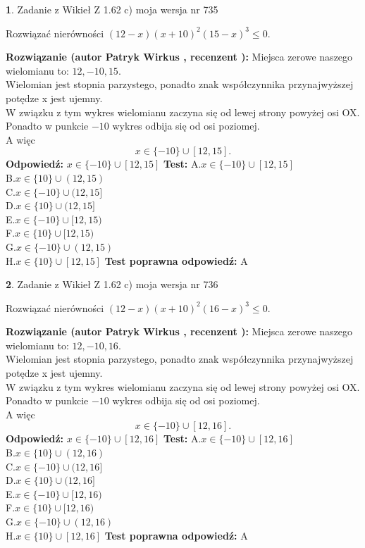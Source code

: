 \documentclass[12pt, a4paper]{article}
\theoremstyle{definition} %
\newtheorem{zad}{}
\newcommand{\zadStart}[1]{\begin{zad}#1\newline}
\newcommand{\zadStop}{\end{zad}}
\newcommand{\rozwStart}[2]{\noindent \textbf{Rozwiązanie (autor #1 , recenzent #2): }\newline}
\newcommand{\rozwStop}{\newline}
\newcommand{\odpStart}{\noindent \textbf{Odpowiedź:}\newline}
\newcommand{\odpStop}{\newline}
\newcommand{\testStart}{\noindent \textbf{Test:}\newline}
\newcommand{\testStop}{\newline}
\newcommand{\kluczStart}{\noindent \textbf{Test poprawna odpowiedź:}\newline}
\newcommand{\kluczStop}{\newline}
\begin{document}
\zadStart{Zadanie z Wikieł Z 1.62 c) moja wersja nr 735}

Rozwiązać nierówności $(12-x)(x+10)^{2}(15-x)^{3}\le0$.
\zadStop
\rozwStart{Patryk Wirkus}{}
Miejsca zerowe naszego wielomianu to: $12, -10, 15$.\\
Wielomian jest stopnia parzystego, ponadto znak współczynnika przy\linebreak najwyższej potędze x jest ujemny.\\ W związku z tym wykres wielomianu zaczyna się od lewej strony powyżej osi OX.\\
Ponadto w punkcie $-10$ wykres odbija się od osi poziomej.\\
A więc $$x \in \{-10\} \cup [12,15].$$
\rozwStop
\odpStart
$x \in \{-10\} \cup [12,15]$
\odpStop
\testStart
A.$x \in \{-10\} \cup [12,15]$\\
B.$x \in \{10\} \cup (12,15)$\\
C.$x \in \{-10\} \cup (12,15]$\\
D.$x \in \{10\} \cup (12,15]$\\
E.$x \in \{-10\} \cup [12,15)$\\
F.$x \in \{10\} \cup [12,15)$\\
G.$x \in \{-10\} \cup (12,15)$\\
H.$x \in \{10\} \cup [12,15]$
\testStop
\kluczStart
A
\kluczStop



\zadStart{Zadanie z Wikieł Z 1.62 c) moja wersja nr 736}

Rozwiązać nierówności $(12-x)(x+10)^{2}(16-x)^{3}\le0$.
\zadStop
\rozwStart{Patryk Wirkus}{}
Miejsca zerowe naszego wielomianu to: $12, -10, 16$.\\
Wielomian jest stopnia parzystego, ponadto znak współczynnika przy\linebreak najwyższej potędze x jest ujemny.\\ W związku z tym wykres wielomianu zaczyna się od lewej strony powyżej osi OX.\\
Ponadto w punkcie $-10$ wykres odbija się od osi poziomej.\\
A więc $$x \in \{-10\} \cup [12,16].$$
\rozwStop
\odpStart
$x \in \{-10\} \cup [12,16]$
\odpStop
\testStart
A.$x \in \{-10\} \cup [12,16]$\\
B.$x \in \{10\} \cup (12,16)$\\
C.$x \in \{-10\} \cup (12,16]$\\
D.$x \in \{10\} \cup (12,16]$\\
E.$x \in \{-10\} \cup [12,16)$\\
F.$x \in \{10\} \cup [12,16)$\\
G.$x \in \{-10\} \cup (12,16)$\\
H.$x \in \{10\} \cup [12,16]$
\testStop
\kluczStart
A
\kluczStop
\end{document}
